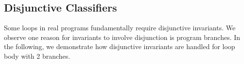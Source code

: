 \subsection{Disjunctive Classifiers}
Some loops in real programs fundamentally require disjunctive invariants.
We observe one reason for invariants to involve disjunction is program branches.
In the following, we demonstrate how disjunctive invariants are handled for loop body with 2 branches.





